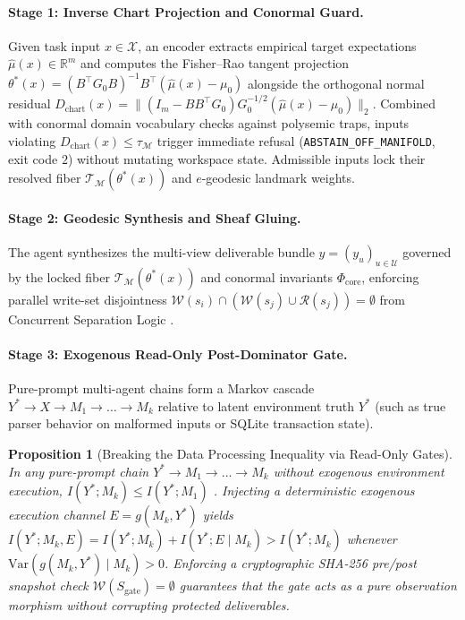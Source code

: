 \documentclass[11pt]{article}
\theoremstyle{definition}
\theoremstyle{plain}
\newtheorem{proposition}{Proposition}
\newcommand{\Xcal}{\mathcal{X}}
\newcommand{\Ucal}{\mathcal{U}}
\newcommand{\Mcal}{\mathcal{M}}
\newcommand{\Tcal}{\mathcal{T}}
\newcommand{\Phicore}{\Phi_{\mathrm{core}}}
\newcommand{\Rbb}{\mathbb{R}}
\begin{document}
\paragraph{Stage 1: Inverse Chart Projection and Conormal Guard.}
Given task input $x \in \Xcal$, an encoder extracts empirical target expectations $\hat{\mu}(x) \in \Rbb^m$ and computes the Fisher--Rao tangent projection $\theta^*(x) = (B^\top G_0 B)^{-1} B^\top (\hat{\mu}(x) - \mu_0)$ alongside the orthogonal normal residual $D_{\mathrm{chart}}(x) = \|(I_m - B B^\top G_0) G_0^{-1/2}(\hat{\mu}(x) - \mu_0)\|_2$. Combined with conormal domain vocabulary checks against polysemic traps, inputs violating $D_{\mathrm{chart}}(x) \le \tau_{\Mcal}$ trigger immediate refusal (\texttt{ABSTAIN\_OFF\_MANIFOLD}, exit code $2$) without mutating workspace state. Admissible inputs lock their resolved fiber $\Tcal_{\Mcal}(\theta^*(x))$ and $e$-geodesic landmark weights.

\paragraph{Stage 2: Geodesic Synthesis and Sheaf Gluing.}
The agent synthesizes the multi-view deliverable bundle $y = (y_u)_{u \in \Ucal}$ governed by the locked fiber $\Tcal_{\Mcal}(\theta^*(x))$ and conormal invariants $\Phicore$, enforcing parallel write-set disjointness $\mathcal{W}(s_i) \cap (\mathcal{W}(s_j) \cup \mathcal{R}(s_j)) = \emptyset$ from Concurrent Separation Logic \citep{reynolds2002separation,ohearn2007resources}.

\paragraph{Stage 3: Exogenous Read-Only Post-Dominator Gate.}
Pure-prompt multi-agent chains form a Markov cascade $Y^* \to X \to M_1 \to \dots \to M_k$ relative to latent environment truth $Y^*$ (such as true parser behavior on malformed inputs or SQLite transaction state).

\begin{proposition}[Breaking the Data Processing Inequality via Read-Only Gates]
\label{prop:dpi}
In any pure-prompt chain $Y^* \to M_1 \to \dots \to M_k$ without exogenous environment execution, $I(Y^*; M_k) \le I(Y^*; M_1)$ \citep{cover2006elements}. Injecting a deterministic exogenous execution channel $E = g(M_k, Y^*)$ yields $I(Y^*; M_k, E) = I(Y^*; M_k) + I(Y^*; E \mid M_k) > I(Y^*; M_k)$ whenever $\mathrm{Var}(g(M_k, Y^*) \mid M_k) > 0$. Enforcing a cryptographic SHA-256 pre/post snapshot check $\mathcal{W}(S_{\mathrm{gate}}) = \emptyset$ guarantees that the gate acts as a pure observation morphism without corrupting protected deliverables.
\end{proposition}
\end{document}
